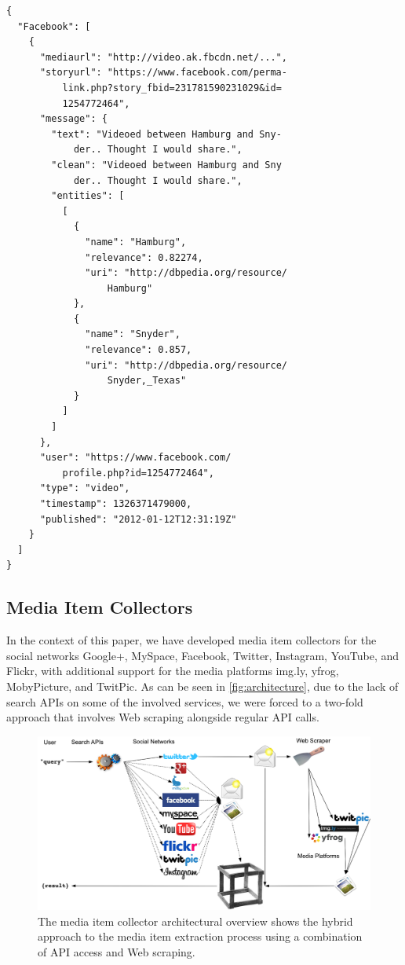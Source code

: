 \documentclass{acm_proc_article-sp}
\begin{document}
\begin{lstlisting}[caption={Sample output of the media collector showing a Facebook post processed with named entity extraction and disambiguation (slightly edited for legibility).},label={lst:media}]
{
  "Facebook": [
    {
      "mediaurl": "http://video.ak.fbcdn.net/...",
      "storyurl": "https://www.facebook.com/perma-
          link.php?story_fbid=231781590231029&id=
          1254772464",
      "message": {
        "text": "Videoed between Hamburg and Sny-
            der.. Thought I would share.",
        "clean": "Videoed between Hamburg and Sny
            der.. Thought I would share.",
        "entities": [
          [
            {
              "name": "Hamburg",
              "relevance": 0.82274,
              "uri": "http://dbpedia.org/resource/
                  Hamburg"
            },
            {
              "name": "Snyder",
              "relevance": 0.857,
              "uri": "http://dbpedia.org/resource/
                  Snyder,_Texas"
            }
          ]
        ]
      },
      "user": "https://www.facebook.com/
          profile.php?id=1254772464",
      "type": "video",
      "timestamp": 1326371479000,
      "published": "2012-01-12T12:31:19Z"
    }
  ]
}
\end{lstlisting}

\subsection{Media Item Collectors}
In the context of this paper, we have developed media item collectors for the social networks Google+, MySpace, Facebook, Twitter, Instagram, YouTube, and Flickr,
with additional support for the media platforms img.ly, yfrog, MobyPicture, and TwitPic.
As can be seen in \autoref{fig:architecture},
due to the lack of search APIs on some of the involved services,
we were forced to a two-fold approach that involves Web scraping alongside regular API calls.

\begin{figure}
\centering
\includegraphics[width=1.0\linewidth]{./resources/architecture.png}
\caption{The media item collector architectural overview shows the hybrid approach to the media item extraction process using a combination of API access and Web scraping.}
\label{fig:architecture}
\end{figure}
\end{document}
